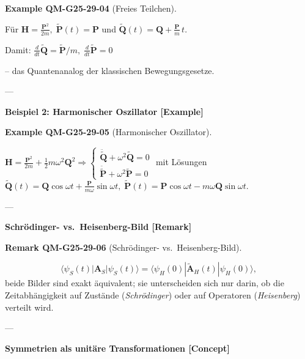 \documentclass[10pt, letterpaper]{article}
\newcommand{\CustomHeading}[3]{%
  \par\medskip\noindent%
  \textbf{#1 #2} \textnormal{(#3)}.\enskip%
}
\newenvironment{REM}[2]{\begin{unitbox}\CustomHeading{Remark}{#1}{#2}}{\end{unitbox}}
\newenvironment{EXA}[2]{\begin{unitbox}\CustomHeading{Example}{#1}{#2}}{\end{unitbox}}
\begin{document}
\begin{EXA}{QM-G25-29-04}{Freies Teilchen}
Für 
\(
\mathbf H=\frac{\mathbf P^{2}}{2m},\;
\tilde{\mathbf P}(t)=\mathbf P
\)
und
\(
\tilde{\mathbf Q}(t)=\mathbf Q+\frac{\mathbf P}{m}\,t.
\)

Damit:
\(
\frac{d}{dt}\tilde{\mathbf Q}= \tilde{\mathbf P}/m,\;
\frac{d}{dt}\tilde{\mathbf P}=0
\)

– das Quantenanalog der klassischen Bewegungsgesetze.
\end{EXA}

---

\textbf{Beispiel 2: Harmonischer Oszillator [Example]}

\begin{EXA}{QM-G25-29-05}{Harmonischer Oszillator}
\(
\mathbf H=\tfrac{\mathbf P^{2}}{2m}+\tfrac12 m\omega^{2}\mathbf Q^{2}
\Rightarrow
\begin{cases}
\ddot{\tilde{\mathbf Q}}+\omega^{2}\tilde{\mathbf Q}=0\\
\ddot{\tilde{\mathbf P}}+\omega^{2}\tilde{\mathbf P}=0
\end{cases}
\)
mit Lösungen
\(
\tilde{\mathbf Q}(t)=
\mathbf Q\cos\omega t+\frac{\mathbf P}{m\omega}\sin\omega t,
\;
\tilde{\mathbf P}(t)=
\mathbf P\cos\omega t-m\omega\mathbf Q\sin\omega t.
\)
\end{EXA}

---

\textbf{Schrödinger- vs.\ Heisenberg-Bild [Remark]}

\begin{REM}{QM-G25-29-06}{Schrödinger- vs.\ Heisenberg-Bild}
\[
\langle\psi_S(t)|\mathbf A_S|\psi_S(t)\rangle
=\langle\psi_H(0)|\tilde{\mathbf A}_H(t)|\psi_H(0)\rangle,
\]
beide Bilder sind exakt äquivalent; sie unterscheiden sich nur darin, ob
die Zeitabhängigkeit auf Zustände (\emph{Schrödinger}) oder auf Operatoren
(\emph{Heisenberg}) verteilt wird.
\end{REM}

---

\textbf{Symmetrien als unitäre Transformationen [Concept]}
\end{document}
